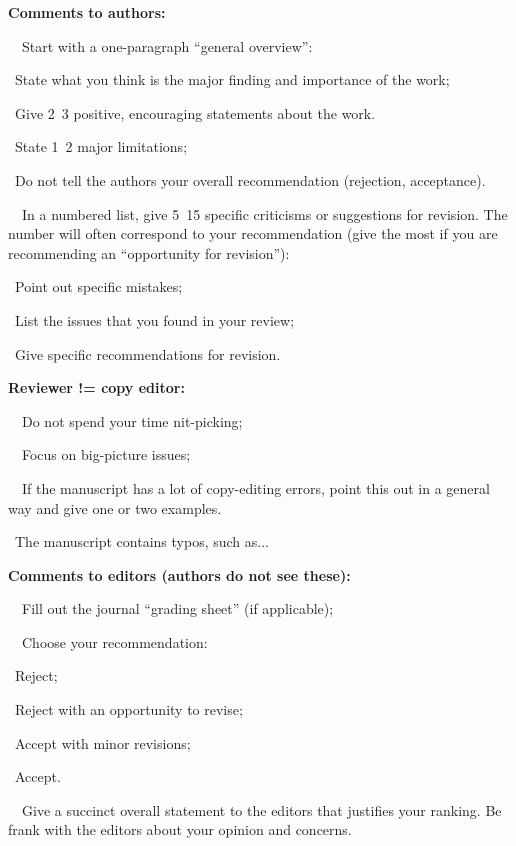 \documentclass[a4paper, 12pt]{article}
\begin{document}
\textbf{Comments to authors:}
\par\ \textbullet\ Start with a one-paragraph ``general overview'':
\par\quad\textopenbullet\ State what you think is the major finding and importance of the work;
\par\quad\textopenbullet\ Give 2~3 positive, encouraging statements about the work.
\par\quad\textopenbullet\ State 1~2 major limitations;
\par\quad\textopenbullet\ Do not tell the authors your overall recommendation (rejection, acceptance).
\par\ \textbullet\ In a numbered list, give 5~15 specific criticisms or suggestions for revision.
The number will often correspond to your recommendation (give the most if you are recommending an ``opportunity for revision''):
\par\quad\textopenbullet\ Point out specific mistakes;
\par\quad\textopenbullet\ List the issues that you found in your review;
\par\quad\textopenbullet\ Give specific recommendations for revision.

\textbf{Reviewer != copy editor:}
\par\ \textbullet\ Do not spend your time nit-picking;
\par\ \textbullet\ Focus on big-picture issues;
\par\ \textbullet\ If the manuscript has a lot of copy-editing errors, point this out in a general way and give one or two examples.
\par\quad\textopenbullet\ The manuscript contains typos, such as...

\textbf{Comments to editors (authors do not see these):}
\par\ \textbullet\ Fill out the journal ``grading sheet'' (if applicable);
\par\ \textbullet\ Choose your recommendation:
\par\quad\textopenbullet\ Reject;
\par\quad\textopenbullet\ Reject with an opportunity to revise;
\par\quad\textopenbullet\ Accept with minor revisions;
\par\quad\textopenbullet\ Accept.
\par\ \textbullet\ Give a succinct overall statement to the editors that justifies your ranking. Be frank with the editors about your opinion and concerns.
\end{document}
